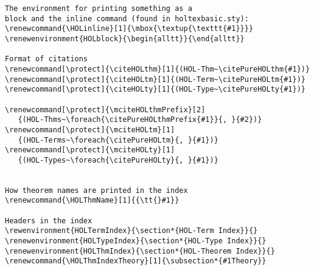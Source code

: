 \documentclass{scrartcl}
\begin{document}
\begin{verbatim}
The environment for printing something as a 
block and the inline command (found in holtexbasic.sty):
\renewcommand{\HOLinline}[1]{\mbox{\textup{\texttt{#1}}}}
\renewenvironment{HOLblock}{\begin{alltt}}{\end{alltt}}

Format of citations
\renewcommand[\protect]{\citeHOLthm}[1]{(HOL-Thm~\citePureHOLthm{#1})}
\renewcommand[\protect]{\citeHOLtm}[1]{(HOL-Term~\citePureHOLtm{#1})}
\renewcommand[\protect]{\citeHOLty}[1]{(HOL-Type~\citePureHOLty{#1})}

\renewcommand[\protect]{\mciteHOLthmPrefix}[2]
   {(HOL-Thms~\foreach{\citePureHOLthmPrefix{#1}}{, }{#2})}
\renewcommand[\protect]{\mciteHOLtm}[1]
   {(HOL-Terms~\foreach{\citePureHOLtm}{, }{#1})}
\renewcommand[\protect]{\mciteHOLty}[1]
   {(HOL-Types~\foreach{\citePureHOLty}{, }{#1})}


How theorem names are printed in the index
\renewcommand{\HOLThmName}[1]{{\tt{}#1}}

Headers in the index
\rewenvironment{HOLTermIndex}{\section*{HOL-Term Index}}{}
\renewenvironment{HOLTypeIndex}{\section*{HOL-Type Index}}{}
\renewenvironment{HOLThmIndex}{\section*{HOL-Theorem Index}}{}
\renewcommand{\HOLThmIndexTheory}[1]{\subsection*{#1Theory}}
\end{verbatim}
\pagebreak
\end{document}
